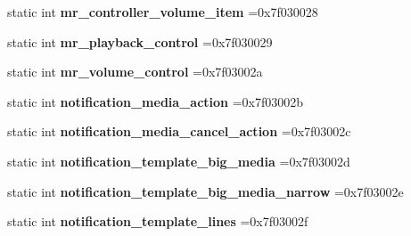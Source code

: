 \begin{DoxyCompactItemize}
\mbox{\label{classandroid_1_1support_1_1v4_1_1R_1_1layout_a593f066156afa9bf471dd51f26455aec}} 
static int {\bfseries mr\+\_\+controller\+\_\+volume\+\_\+item} =0x7f030028
\item 
\mbox{\label{classandroid_1_1support_1_1v4_1_1R_1_1layout_a0d8c4d33c93f82061b4494ca1369e6a2}} 
static int {\bfseries mr\+\_\+playback\+\_\+control} =0x7f030029
\item 
\mbox{\label{classandroid_1_1support_1_1v4_1_1R_1_1layout_a8c19427255de27079a34d6ca0a4dc147}} 
static int {\bfseries mr\+\_\+volume\+\_\+control} =0x7f03002a
\item 
\mbox{\label{classandroid_1_1support_1_1v4_1_1R_1_1layout_a5eae9454a1a06aa3e15eb52c986563b3}} 
static int {\bfseries notification\+\_\+media\+\_\+action} =0x7f03002b
\item 
\mbox{\label{classandroid_1_1support_1_1v4_1_1R_1_1layout_a2178eabddb33f3369ce604d46c682374}} 
static int {\bfseries notification\+\_\+media\+\_\+cancel\+\_\+action} =0x7f03002c
\item 
\mbox{\label{classandroid_1_1support_1_1v4_1_1R_1_1layout_addbb542348ec4114ac91921143068c03}} 
static int {\bfseries notification\+\_\+template\+\_\+big\+\_\+media} =0x7f03002d
\item 
\mbox{\label{classandroid_1_1support_1_1v4_1_1R_1_1layout_a10cc98eaeed8add01b7e03f3814af401}} 
static int {\bfseries notification\+\_\+template\+\_\+big\+\_\+media\+\_\+narrow} =0x7f03002e
\item 
\mbox{\label{classandroid_1_1support_1_1v4_1_1R_1_1layout_a09d35fdf3303d7d2b04d6dfe86f8f446}} 
static int {\bfseries notification\+\_\+template\+\_\+lines} =0x7f03002f
\item 
\mbox{\label{classandroid_1_1support_1_1v4_1_1R_1_1layout_a3594060d8dccd88db551ef57c7faee2b}} 

\end{DoxyCompactItemize}
